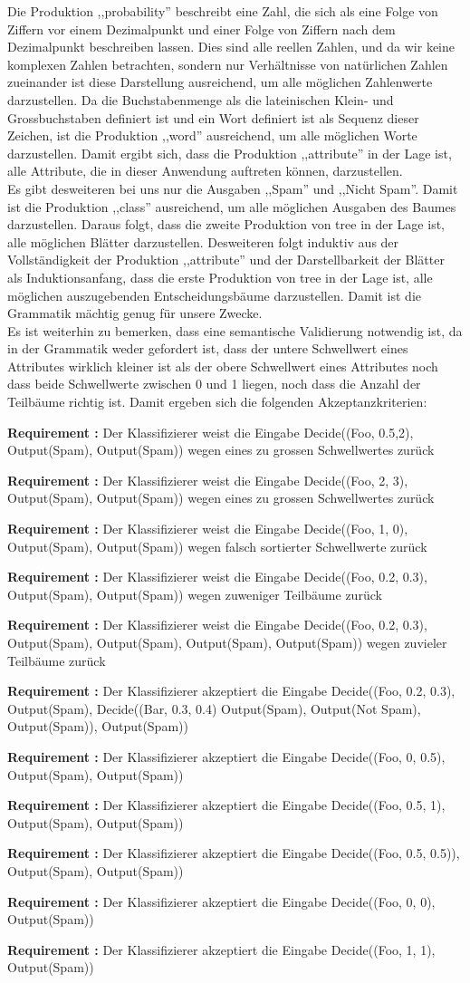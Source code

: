 \documentclass{article}
\newcounter{requirementscount}{}
\newcommand{\requirement}[1] {
        \addtocounter{requirementscount}{1}
        {\bf Requirement \therequirementscount:} #1\\
    }
\begin{document}
Die Produktion ,,probability'' beschreibt eine Zahl, die sich als
eine Folge von Ziffern vor einem Dezimalpunkt und einer Folge von
Ziffern nach dem Dezimalpunkt beschreiben lassen. Dies sind alle
reellen Zahlen, und da wir keine komplexen Zahlen betrachten, sondern
nur Verh\"altnisse von nat\"urlichen Zahlen zueinander ist diese
Darstellung ausreichend, um alle m\"oglichen Zahlenwerte darzustellen.
Da die Buchstabenmenge als die lateinischen Klein- und Grossbuchstaben
definiert ist und ein Wort definiert ist als Sequenz dieser Zeichen,
ist die Produktion ,,word''  ausreichend, um alle m\"oglichen Worte
darzustellen. Damit ergibt sich, dass die Produktion 
,,attribute'' in der Lage ist, alle Attribute, die in dieser
Anwendung auftreten k\"onnen, darzustellen.\\
Es gibt desweiteren bei uns nur die Ausgaben ,,Spam'' und ,,Nicht Spam''.
Damit ist die Produktion ,,class'' ausreichend, um alle 
m\"oglichen Ausgaben des Baumes darzustellen. Daraus folgt, dass die
zweite Produktion von tree in der Lage ist, alle m\"oglichen Bl\"atter
darzustellen. Desweiteren folgt induktiv aus der Vollst\"andigkeit der
Produktion ,,attribute'' und der Darstellbarkeit der Bl\"atter als
Induktionsanfang, dass die erste Produktion von tree in der Lage ist,
alle m\"oglichen auszugebenden Entscheidungsb\"aume darzustellen. Damit
ist die Grammatik m\"achtig genug f\"ur unsere Zwecke.\\
Es ist weiterhin zu bemerken, dass eine semantische Validierung notwendig
ist, da in der Grammatik weder gefordert ist, dass der untere Schwellwert
eines Attributes wirklich kleiner ist als der obere Schwellwert 
eines Attributes noch dass beide Schwellwerte zwischen 0 und 1 liegen, noch
dass die Anzahl der Teilb\"aume richtig ist. Damit ergeben sich die folgenden
Akzeptanzkriterien:\\
\requirement{Der Klassifizierer weist die Eingabe Decide((Foo, 0.5,2),
Output(Spam), Output(Spam)) wegen eines zu grossen Schwellwertes zur\"uck}
\requirement{Der Klassifizierer weist die Eingabe Decide((Foo, 2, 3),
Output(Spam), Output(Spam)) wegen eines zu grossen Schwellwertes zur\"uck}
\requirement{Der Klassifizierer weist die Eingabe Decide((Foo, 1, 0),
Output(Spam), Output(Spam)) wegen falsch sortierter Schwellwerte zur\"uck}
\requirement{Der Klassifizierer weist die Eingabe Decide((Foo, 0.2, 0.3),
Output(Spam), Output(Spam)) wegen zuweniger Teilb\"aume zur\"uck}
\requirement{Der Klassifizierer weist die Eingabe Decide((Foo, 0.2, 0.3),
Output(Spam), Output(Spam), Output(Spam), Output(Spam)) wegen zuvieler
Teilb\"aume zur\"uck}
\requirement{Der Klassifizierer akzeptiert die Eingabe 
Decide((Foo, 0.2, 0.3), 
    Output(Spam),
    Decide((Bar, 0.3, 0.4)
        Output(Spam),
        Output(Not Spam), 
        Output(Spam)),
    Output(Spam))}
\requirement{Der Klassifizierer akzeptiert die Eingabe Decide((Foo, 0, 0.5),
Output(Spam), Output(Spam))}
\requirement{Der Klassifizierer akzeptiert die Eingabe Decide((Foo, 0.5, 1),
Output(Spam), Output(Spam))}
\requirement{Der Klassifizierer akzeptiert die Eingabe 
Decide((Foo, 0.5, 0.5)), Output(Spam), Output(Spam))}
\requirement{Der Klassifizierer akzeptiert die Eingabe Decide((Foo, 0, 0),
Output(Spam))}
\requirement{Der Klassifizierer akzeptiert die Eingabe Decide((Foo, 1, 1),
Output(Spam))}
\end{document}
